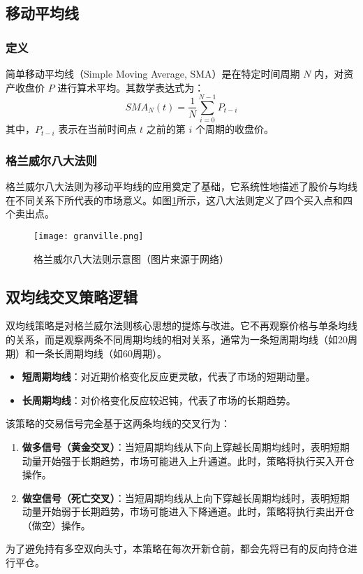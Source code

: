 \documentclass[UTF8]{ctexart}
\begin{document}
\subsection{移动平均线}

\subsubsection{定义}
简单移动平均线（Simple Moving Average, SMA）是在特定时间周期 $N$ 内，对资产收盘价 $P$ 进行算术平均。其数学表达式为：
$$
SMA_N(t) = \frac{1}{N} \sum_{i=0}^{N-1} P_{t-i}
$$
其中，$P_{t-i}$ 表示在当前时间点 $t$ 之前的第 $i$ 个周期的收盘价。

\subsubsection{格兰威尔八大法则}
格兰威尔八大法则为移动平均线的应用奠定了基础，它系统性地描述了股价与均线在不同关系下所代表的市场意义。如图\ref{fig:granville}所示，这八大法则定义了四个买入点和四个卖出点。

\begin{figure}[H]
    \centering
    \texttt{[image: granville.png]}
    \caption{格兰威尔八大法则示意图（图片来源于网络）}
    \label{fig:granville}
\end{figure}

\subsection{双均线交叉策略逻辑}
双均线策略是对格兰威尔法则核心思想的提炼与改进。它不再观察价格与单条均线的关系，而是观察两条不同周期均线的相对关系，通常为一条短周期均线（如20周期）和一条长周期均线（如60周期）。
\begin{itemize}
    \item \textbf{短周期均线}：对近期价格变化反应更灵敏，代表了市场的短期动量。
    \item \textbf{长周期均线}：对价格变化反应较迟钝，代表了市场的长期趋势。
\end{itemize}
该策略的交易信号完全基于这两条均线的交叉行为：
\begin{enumerate}
    \item \textbf{做多信号（黄金交叉）}：当短周期均线从下向上穿越长周期均线时，表明短期动量开始强于长期趋势，市场可能进入上升通道。此时，策略将执行买入开仓操作。
    \item \textbf{做空信号（死亡交叉）}：当短周期均线从上向下穿越长周期均线时，表明短期动量开始弱于长期趋势，市场可能进入下降通道。此时，策略将执行卖出开仓（做空）操作。
\end{enumerate}
为了避免持有多空双向头寸，本策略在每次开新仓前，都会先将已有的反向持仓进行平仓。
\end{document}

